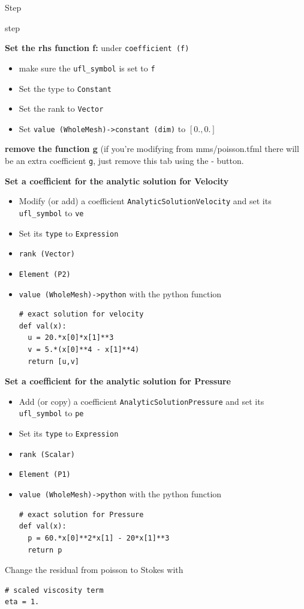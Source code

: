 \begin{steps}{Step}
\begin{steps}{step}
\begin{itemize}
    \end{itemize}
  \item \textbf{Set the rhs function f:} under \texttt{coefficient (f)}
    \begin{itemize}
    \item make sure the \texttt{ufl\_symbol} is set to \texttt{f}
    \item Set the type to \texttt{Constant}
    \item Set the rank to \texttt{Vector}
    \item Set \texttt{value (WholeMesh)->constant (dim)} to $[0.,0.]$
    \end{itemize}
  \item \textbf{remove the function g} (if you're modifying from
    mms/poisson.tfml there will be an extra coefficient \texttt{g},
    just remove this tab using the - button.
  \item \textbf{Set a coefficient for the analytic solution for Velocity}
    \begin{itemize}
    \item Modify (or add) a coefficient
      \texttt{AnalyticSolutionVelocity} and set its
      \texttt{ufl\_symbol} to \texttt{ve}
    \item Set its \texttt{type} to \texttt{Expression}
    \item \texttt{rank (Vector)}
    \item \texttt{Element (P2)}
    \item \texttt{value (WholeMesh)->python} with the python function
      \begin{lstlisting}[style=Python]
# exact solution for velocity
def val(x):
  u = 20.*x[0]*x[1]**3
  v = 5.*(x[0]**4 - x[1]**4)
  return [u,v]
      \end{lstlisting}
    \end{itemize}
 \item \textbf{Set a coefficient for the analytic solution for Pressure}
    \begin{itemize}
    \item Add (or copy) a coefficient
      \texttt{AnalyticSolutionPressure} and set its
      \texttt{ufl\_symbol} to \texttt{pe}
    \item Set its \texttt{type} to \texttt{Expression}
    \item \texttt{rank (Scalar)}
    \item \texttt{Element (P1)}
    \item \texttt{value (WholeMesh)->python} with the python function
      \begin{lstlisting}[style=Python]
# exact solution for Pressure
def val(x):
  p = 60.*x[0]**2*x[1] - 20*x[1]**3
  return p
      \end{lstlisting}
    \end{itemize}
  \item Change the residual from poisson to Stokes with
    \begin{lstlisting}[style=UFL]
# scaled viscosity term
eta = 1.


\end{lstlisting}
\end{steps}
\end{steps}
